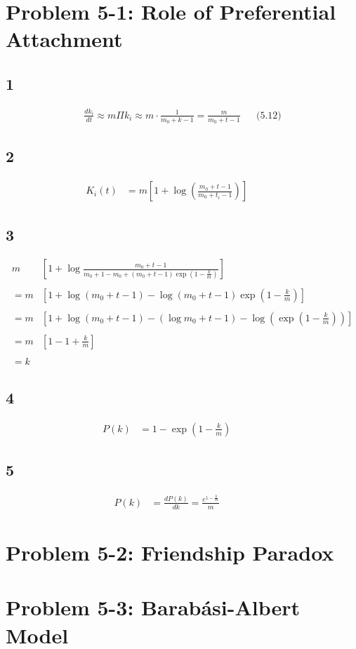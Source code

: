 \documentclass {article}
\begin{document}
\section*{Problem 5-1: Role of Preferential Attachment}

\subsection*{1}
\begin{align*}
 \frac{dk_{i}}{dt} \approx 
 m \Pi k_{i} \approx 
 m \cdot \frac{1}{m_0 + k-1} = 
 \frac{m}{m_0 + t -1}&&   \text{(5.12)}
\end{align*}

\subsection*{2}
\begin{align*}
    K_i(t)& = m \left[ 1 + \log \left( \frac{m_0 + t - 1}{m_0 + t_i - 1} \right) \right]
    &&&&
\end{align*}

\subsection*{3}
\begin{align*}
  m &\left[ 1 + \log  \frac{m_0 + t - 1}{m_0 + 1 - m_0 + (m_0 + t - 1)\exp \left( 1 - \frac{k}{m} \right)}  \right]  \\ \\
  = m &\left[ 1 + \log( m_0 + t - 1) - \log (m_0 + t - 1) \exp \left( 1 - \frac{k}{m}\right) \right] \\ \\
  = m &\left[ 1 + \log(m_0 + t - 1) - (\log m_0 + t - 1)  - \log \left( \exp \left( 1 - \frac{k}{m} \right) \right) \right] \\ \\
  = m &\left[ 1 - 1 + \frac{k}{m} \right] \\ \\
  = k   
\end{align*}

\subsection*{4}
\begin{align*}
 P(k) & = 1 - \exp \left( 1 - \frac{k}{m} \right) &&&&
\end{align*}

\subsection*{5}
\begin{align*}
 P(k) & = \frac{dP(k)}{dk} = \frac{e^{1 - \frac{k}{m}}}{m} &&&&
\end{align*}

\newpage
\section*{Problem 5-2: Friendship Paradox}


\newpage
\section*{Problem 5-3: Barabási-Albert Model}
\end{document}
